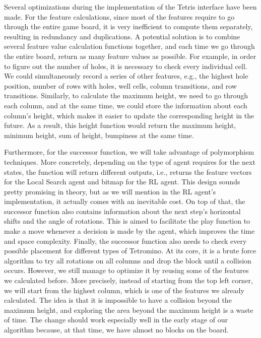 \documentclass[letterpaper]{article} %
\begin{document}
\begin{itemize}
  Several optimizations during the implementation of the Tetris interface have been made. For the feature calculations, since most of the features require to go through the entire game board, it is very inefficient to compute them separately, resulting in redundancy and duplications. A potential solution is to combine several feature value calculation functions together, and each time we go through the entire board, return as many feature values as possible. For example, in order to figure out the number of holes, it is necessary to check every individual cell. We could simultaneously record a series of other features, e.g., the highest hole position, number of rows with holes, well cells, column transitions, and row transitions. Similarly, to calculate the maximum height, we need to go through each column, and at the same time, we could store the information about each column's height, which makes it easier to update the corresponding height in the future. As a result, this height function would return the maximum height, minimum height, sum of height, bumpiness at the same time.
 
  Furthermore, for the successor function, we will take advantage of polymorphism techniques. More concretely, depending on the type of agent requires for the next states, the function will return different outputs, i.e., returns the feature vectors for the Local Search agent and bitmap for the RL agent. This design sounds pretty promising in theory, but as we will mention in the RL agent's implementation, it actually comes with an inevitable cost. On top of that, the successor function also contains information about the next step's horizontal shifts and the angle of rotations. This is aimed to facilitate the play function to make a move whenever a decision is made by the agent, which improves the time and space complexity. Finally, the successor function also needs to check every possible placement for different types of Tetromino. At its core, it is a brute force algorithm to try all rotations on all columns and drop the block until a collision occurs. However, we still manage to optimize it by reusing some of the features we calculated before. More precisely, instead of starting from the top left corner, we will start from the highest column, which is one of the features we already calculated. The idea is that it is impossible to have a collision beyond the maximum height, and exploring the area beyond the maximum height is a waste of time. The change should work especially well in the early stage of our algorithm because, at that time, we have almost no blocks on the board.
 

\end{itemize}
\end{document}
